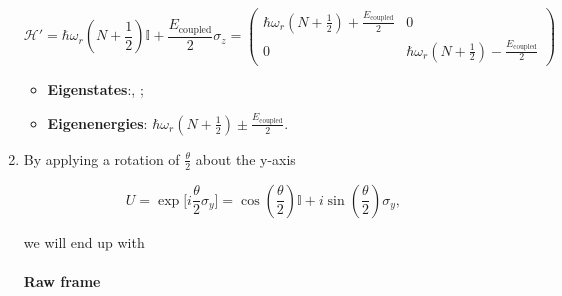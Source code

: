\begin{enumerate}
\begin{framed}
    \[      \mathcal{H'}      =     \hbar\omega_r(N+\frac{1}{2})\mathbb{I}      +
      \frac{E_\text{coupled}}{2}\sigma_z             =            \begin{pmatrix}
        \hbar\omega_r(N+\frac{1}{2})   +   \frac{E_\text{coupled}}{2}   &   0\\0&
        \hbar\omega_r(N+\frac{1}{2}) - \frac{E_\text{coupled}}{2}
      \end{pmatrix}
    \]
    \begin{itemize}
    \item \textbf{Eigenstates}:\hfill {}, ;
    \item                      \textbf{Eigenenergies}:                     \hfill
      $ \hbar\omega_r(N+\frac{1}{2}) \pm \frac{E_\text{coupled}}{2} $.
    \end{itemize}
  \end{framed}

\item By applying a rotation of $ \frac{\theta}{2} $ about the y-axis

  \[
    U            =           \exp\big[i\frac{\theta}{2}\sigma_y\big]            =
    \cos(\frac{\theta}{2})\mathbb{I} + i\sin(\frac{\theta}{2})\sigma_y,
  \]

  \noindent we will end up with

  \begin{framed}\noindent
    \paragraph{Raw frame}



\end{framed}
\end{enumerate}
